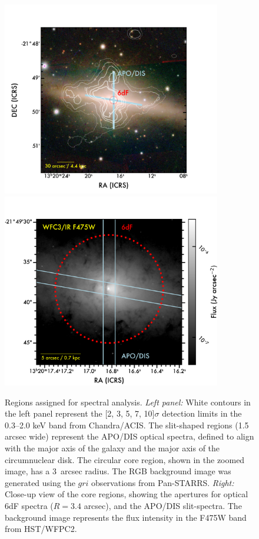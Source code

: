 \documentclass[modern]{CORE-AAS/aastex631}
\begin{document}
\begin{figure}[t!]
\begin{center}
\includegraphics[trim={0 0 70 0}, clip, height=8.5cm]{FIGURES/NGC5084_spectra_regions_wide.png}\includegraphics[trim={0 0 0 0}, clip, height=8.5cm]{FIGURES/NGC5084_regions_core.png}
\caption{Regions assigned for spectral analysis. \emph{Left panel:} White contours in the left panel represent the [2, 3, 5, 7, 10]$\sigma$ detection limits in the 0.3--2.0 keV band from Chandra/ACIS. The slit-shaped regions (1.5 arcsec wide) represent the APO/DIS optical spectra, defined to align with the major axis of the galaxy and the major axis of the circumnuclear disk. The circular core region, shown in the zoomed image, has a 3~arcsec radius. The RGB background image was generated using the $gri$ observations from Pan-STARRS. \emph{Right:} Close-up view of the core regions, showing the apertures for optical 6dF spectra ($R=3.4$ arcsec), and the APO/DIS slit-spectra. The background image represents the flux intensity in the F475W band from HST/WFPC2.} 
\label{fig:NGC5084_spectra_regions}
\end{center}
\end{figure}
\end{document}
